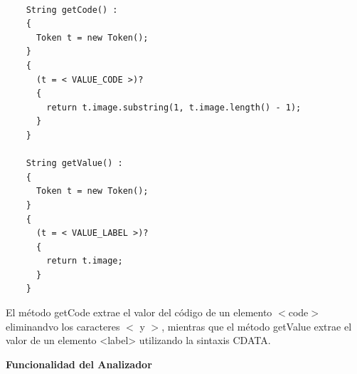 \lstset{inputencoding=utf8/latin1}
\begin{lstlisting}

    String getCode() :
    {
      Token t = new Token();
    }
    {
      (t = < VALUE_CODE >)?
      {
        return t.image.substring(1, t.image.length() - 1);
      }
    }
    
    String getValue() :
    {
      Token t = new Token();
    }
    {
      (t = < VALUE_LABEL >)?
      {
        return t.image;
      }
    }  
\end{lstlisting}

El método getCode extrae el valor del código de un elemento $<$code$>$ eliminandvo los caracteres $<$ y $>$, mientras que el método getValue extrae el valor de un elemento <label> utilizando la sintaxis CDATA.



\phantom{text}

\noindent \textbf{Funcionalidad del Analizador}

\phantom{text}





